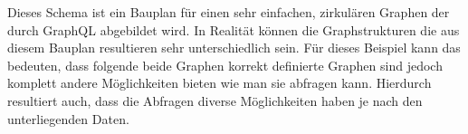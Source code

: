 \begin{figure2}
    \begin{center}
    \end{center}
    \label{fig:2typescirc}
\end{figure2}

Dieses Schema ist ein Bauplan für einen sehr einfachen, zirkulären Graphen der durch GraphQL abgebildet wird.
In Realität können die Graphstrukturen die aus diesem Bauplan resultieren sehr unterschiedlich sein.
Für dieses Beispiel kann das bedeuten, dass folgende beide Graphen korrekt definierte Graphen sind jedoch komplett
andere Möglichkeiten bieten wie man sie abfragen kann. Hierdurch resultiert auch, dass die Abfragen
diverse Möglichkeiten haben je nach den unterliegenden Daten.


